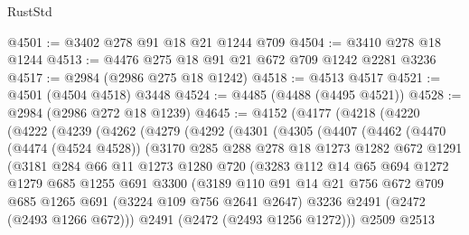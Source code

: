 \begin{lexlean}{RustStd}
\begin{coremodule}
@4501 := @3402 @278 @91 @18 @21 @1244 @709
@4504 := @3410 @278 @18 @1244
@4513 := @4476 @275 @18 @91 @21 @672 @709 @1242 @2281 @3236
@4517 := @2984 (@2986 @275 @18 @1242)
@4518 := @4513 @4517
@4521 := @4501 (@4504 @4518) @3448
@4524 := @4485 (@4488 (@4495 @4521))
@4528 := @2984 (@2986 @272 @18 @1239)
@4645 := @4152
    (@4177
      (@4218
        (@4220
          (@4222
            (@4239
              (@4262
                (@4279
                  (@4292
                    (@4301
                      (@4305
                        (@4407
                          (@4462
                            (@4470
                              (@4474 (@4524 @4528))
                              (@3170
                                @285
                                @288
                                @278
                                @18
                                @1273
                                @1282
                                @672
                                @1291
                                (@3181
                                  @284
                                  @66
                                  @11
                                  @1273
                                  @1280
                                  @720
                                  (@3283
                                    @112
                                    @14
                                    @65
                                    @694
                                    @1272
                                    @1279
                                    @685
                                    @1255
                                    @691
                                    @3300
                                    (@3189
                                      @110
                                      @91
                                      @14
                                      @21
                                      @756
                                      @672
                                      @709
                                      @685
                                      @1265
                                      @691
                                      (@3224 @109 @756 @2641 @2647)
                                      @3236
                                      @2491
                                      (@2472 (@2493 @1266 @672)))
                                    @2491
                                    (@2472 (@2493 @1256 @1272)))
                                  @2509
                                  @2513

\end{coremodule}
\end{lexlean}
